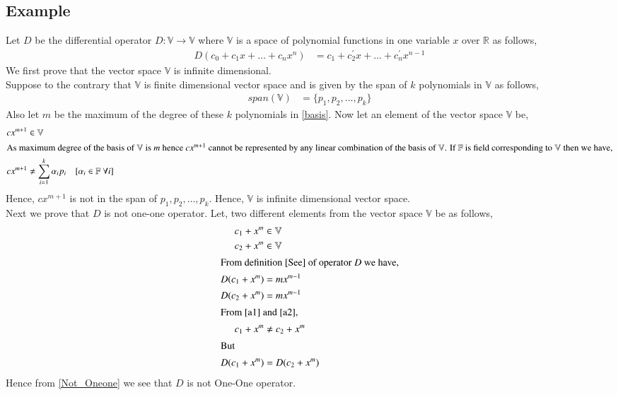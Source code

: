 \documentclass[journal,12pt,twocolumn]{IEEEtran}
\begin{document}
\subsection{Example}
Let $D$ be the differential operator $D:\mathbb{V} \xrightarrow{} \mathbb{V}$ where $\mathbb{V}$ is a space of polynomial functions in one variable $x$ over $\mathbb{R}$ as follows,
\begin{align}
D(c_0+c_1x+\dots+c_nx^n) &= c_1+c^{\prime}_2x+\dots+c^{\prime}_nx^{n-1}\label{See}
\end{align}
We first prove that the vector space $\mathbb{V}$ is infinite dimensional.\\
Suppose to the contrary that $\mathbb{V}$ is finite dimensional vector space and is given by the span of $k$ polynomials in $\mathbb{V}$ as follows,
\begin{align}
span(\mathbb{V}) &= \{p_1,p_2,\dots,p_k\}\label{basis}
\end{align}
Also let $m$ be the maximum of the degree of these $k$ polynomials in \eqref{basis}. Now let an element of the vector space $\mathbb{V}$ be,
\begin{align}
cx^{m+1} &\in \mathbb{V}\\
\intertext{As maximum degree of the basis of $\mathbb{V}$ is $m$ hence $cx^{m+1}$ cannot be represented by any linear combination of the basis of $\mathbb{V}$. If $\mathbb{F}$ is field corresponding to $\mathbb{V}$ then we have,}
cx^{m+1} &\ne \sum_{i=1}^{k}\alpha_ip_i \quad{\text{[$\alpha_i \in \mathbb{F}$ $\forall i$]}}
\end{align}
Hence, $cx^{m+1}$ is not in the span of ${p_1,p_2,\dots,p_k}$. Hence, $\mathbb{V}$ is infinite dimensional vector space.\\
Next we prove that $D$ is not one-one operator. Let, two different elements from the vector space $\mathbb{V}$ be as follows,
\begin{align}
c_1+x^m &\in \mathbb{V}\\
c_2+x^m &\in \mathbb{V}\\
\intertext{From definition \eqref{See} of operator $D$ we have,}
D(c_1+x^m) &= mx^{m-1}\label{a1}\\
D(c_2+x^m) &= mx^{m-1}\label{a2}\\
\intertext{From \eqref{a1} and \eqref{a2},}
c_1+x^m &\ne c_2+x^m\\
\intertext{But}
D(c_1+x^m) &= D(c_2+x^m)\label{Not_Oneone}
\end{align}
Hence from \eqref{Not_Oneone} we see that $D$ is not One-One operator.\\
\end{document}

